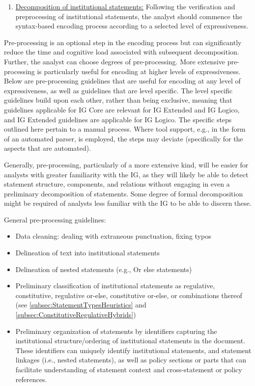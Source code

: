 \begin{enumerate}
{\begin{minipage}{15.5cm}
\end{minipage}}

\item \underline{Decomposition of institutional statements:} Following the verification and preprocessing of institutional statements, the analyst should commence the syntax-based encoding process according to a selected level of expressiveness.
\end{enumerate}

Pre-processing is an optional step in the encoding process but can significantly reduce the time and cognitive load associated with subsequent decomposition. Further, the analyst can choose degrees of pre-processing. More extensive pre-processing is particularly useful for encoding at higher levels of expressiveness. Below are pre-processing guidelines that are useful for encoding at any level of expressiveness, as well as guidelines that are level specific. The level specific guidelines build upon each other, rather than being exclusive, meaning that guidelines applicable for IG Core are relevant for IG Extended and IG Logico, and IG Extended guidelines are applicable for IG Logico. The specific steps outlined here pertain to a manual process. Where tool support, e.g., in the form of an automated parser, is employed, the steps may deviate (specifically for the aspects that are automated).

Generally, pre-processing, particularly of a more extensive kind, will be easier for analysts with greater familiarity with the IG, as they will likely be able to detect statement structure, components, and relations without engaging in even a preliminary decomposition of statements. Some degree of formal decomposition might be required of analysts less familiar with the IG to be able to discern these.

\begin{ptit}General pre-processing guidelines:\end{ptit}

\begin{itemize}
    \item Data cleaning: dealing with extraneous punctuation, fixing typos
    \item Delineation of text into institutional statements
    \item Delineation of nested statements (e.g., Or else statements) 
    \item Preliminary classification of institutional statements as regulative, constitutive, regulative or-else, constitutive or-else, or combinations thereof (see \cref{subsec:StatementTypesHeuristics} and  \cref{subsec:ConstitutiveRegulativeHybrids})
    \item Preliminary organization of statements by identifiers capturing the institutional structure/ordering of institutional statements in the document. These identifiers can uniquely identify institutional statements, and statement linkages (i.e., nested statements), as well as policy sections or parts that can facilitate understanding of statement context and cross-statement or policy references.
\end{itemize}

